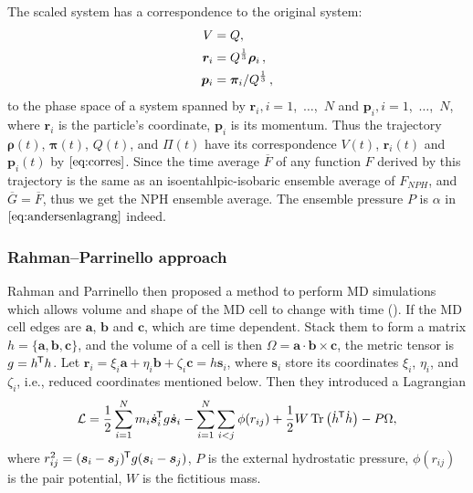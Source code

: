 The scaled system has a correspondence to the original system:
\begin{align}\label{eq:corres}
	V        & = Q,                                           \\
	\bm{r}_i & = Q^{\frac{ 1 }{ 3 }} \bm{\rho}_i \thinspace,  \\
	\bm{p}_i & = \bm{\pi}_i / Q^{\frac{ 1 }{ 3 }} \thinspace,
\end{align}
to the phase space of a system spanned by
$\bm{r}_i, i=1$,~$\ldots$,~$N$ and
$\bm{p}_i, i=1$,~$\ldots$,~$N$,
where $\bm{r}_i$ is the particle's coordinate, $\bm{p}_i$ is its momentum.
Thus the trajectory
$\bm{\rho}(t)$, $\bm{\pi}(t)$, $Q(t)$, and $\Pi(t)$ have its
correspondence $V(t)$, $\bm{r}_i(t)$ and $\bm{p}_i(t)$ by
$\eqref{eq:corres}$.
Since the time average $\overline{F}$ of any function $F$
derived by this trajectory is the same as an
isoentahlpic-isobaric ensemble average of $F_{NPH}$, and
$\overline{G} = \overline{F}$, thus we get the NPH ensemble average.
The ensemble pressure $P$ is $\alpha$ in $\eqref{eq:andersenlagrang}$ indeed.


\subsubsection{Rahman--Parrinello approach}
\label{sssec:rpa}

Rahman and Parrinello then proposed a method to perform
MD simulations which allows volume and shape of the MD cell
to change with time (\cite{Parrinello:1980kx}).
If the MD cell edges are $\bm{a}$, $\bm{b}$
and $\bm{c}$, which are time dependent. Stack them to form a
matrix $h = \{ \bm{a}, \bm{b}, \bm{c} \}$, and the volume of a cell
is then $\Omega = \bm{a} \cdot \bm{b} \times \bm{c}$, the metric
tensor is $g = h^{\mkern-1.5mu\mathsf{T}} h$. Let $\bm{r}_i = \xi_i \bm{a} + \eta_i \bm{b}
	+ \zeta_i \bm{c} = h \bm{s}_i$, where $\bm{s}_i$ store its coordinates
$\xi_i$, $\eta_i$, and $\zeta_i$, i.e., reduced coordinates mentioned below.
Then they introduced a Lagrangian
\begin{equation}\label{eq:rplag}
	\mathcal{L} = \frac{ 1 }{ 2 } \sum_{i=1}^{N} m_i \dot{ \bm{s} }_i ^{\mkern-1.5mu\mathsf{T}}
	g \dot{ \bm{s} }_i - \sum_{i=1}^{N} \sum_{i<j} \phi (r_{ij}) +
	\frac{ 1 }{ 2 } W \Tr \big(\dot{h} ^{\mkern-1.5mu\mathsf{T}} \dot{h} \big) - P \Omega,
\end{equation}
where $r_{ij}^2 = (\bm{s}_i - \bm{s}_j)^{\mkern-1.5mu\mathsf{T}} g (\bm{s}_i - \bm{s}_j)$,
$P$ is the external hydrostatic pressure, $\phi(r_{ij})$ is the pair
potential, $W$ is the fictitious mass.

